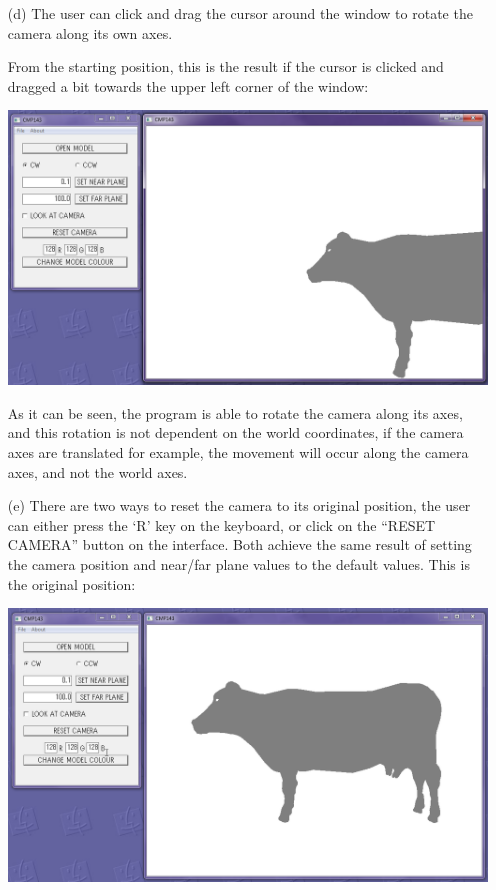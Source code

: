 \documentclass[12pt]{article}
\begin{document}
\begin{itemize}
\item[(d)] The user can click and drag the cursor around the window to rotate the camera along its own axes.

From the starting position, this is the result if the cursor is clicked and dragged a bit towards the upper left corner of the window:
\begin{center}
	\includegraphics[scale=0.5]{9.png}
\end{center}
As it can be seen, the program is able to rotate the camera along its axes, and this rotation is not dependent on the world coordinates, if the camera axes are translated for example, the movement will occur along the camera axes, and not the world axes.

\item[(e)] There are two ways to reset the camera to its original position, the user can either press the `R' key on the keyboard, or click on the ``RESET CAMERA'' button on the interface. Both achieve the same result of setting the camera position and near/far plane values to the default values. This is the original position: 
\begin{center}
	\includegraphics[scale=0.5]{3.png}
\end{center}


\end{itemize}
\end{document}
